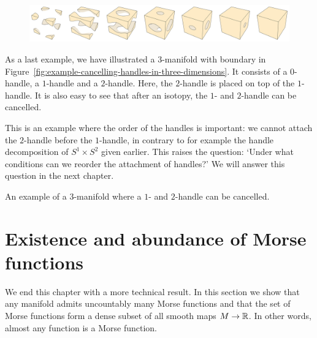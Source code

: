\begin{eg}[$T^{3} = S^{1} \times S^{1} \times S^{1}$]
    \begin{figure}[H]
    \centering
    \includegraphics[width=0.90\paperwidth]{./notebooks/three-torus/output.png}
    \label{fig:three-torus-handle-decomposition}
\end{figure}
\end{eg}

\begin{eg}
    As a last example, we have illustrated a $3$-manifold with boundary in Figure~\ref{fig:example-cancelling-handles-in-three-dimensions}.
    It consists of a $0$-handle, a $1$-handle and a $2$-handle.
    Here, the $2$-handle is placed on top of the $1$-handle.
    It is also easy to see that after an isotopy, the $1$- and $2$-handle can be cancelled.

    This is an example where the order of the handles is important: we cannot attach the $2$-handle before the $1$-handle, in contrary to for example the handle decomposition of $ S^1 \times S^2$ given earlier.
    This raises the question: `Under what conditions can we reorder the attachment of handles?' We will answer this question in the next chapter.

    \begin{marginfigure}
    \centering
    \caption{An example of a $3$-manifold where a $1$- and $2$-handle can be cancelled.}
    \label{fig:example-cancelling-handles-in-three-dimensions}
\end{marginfigure}
\end{eg}





\section{Existence and abundance of Morse functions}
We end this chapter with a more technical result.
In this section we show that any manifold admits uncountably many Morse functions and that the set of Morse functions form a dense subset of all smooth maps $M \to  \mathbb{R}$.
In other words, almost any function is a Morse function.

